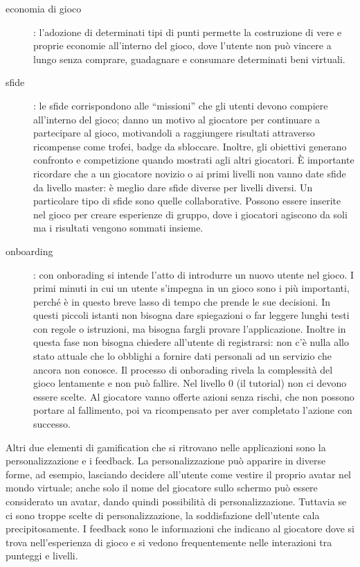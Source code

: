 \begin{description}
    \item[economia di gioco]: l'adozione di determinati tipi di punti permette la costruzione di vere e proprie economie all'interno del gioco, dove l'utente non può vincere a lungo senza comprare, guadagnare e consumare determinati beni virtuali.
    \item[sfide]: le sfide corrispondono alle ``missioni'' che gli utenti devono compiere all'interno del gioco; danno un motivo al giocatore per continuare a partecipare al gioco, motivandoli a raggiungere risultati attraverso ricompense come trofei, badge da sbloccare. Inoltre, gli obiettivi generano confronto e competizione quando mostrati agli altri giocatori. È importante ricordare che a un giocatore novizio o ai primi livelli non vanno date sfide da livello master: è meglio dare sfide diverse per livelli diversi. Un particolare tipo di sfide sono quelle collaborative. Possono essere inserite nel gioco per creare esperienze di gruppo, dove i giocatori agiscono da soli ma i risultati vengono sommati insieme.
    \item[onboarding]: con onborading si intende l'atto di introdurre un nuovo utente nel gioco. I primi minuti in cui un utente s'impegna in un gioco sono i più importanti, perché è in questo breve lasso di tempo che prende le sue decisioni. In questi piccoli istanti non bisogna dare spiegazioni o far leggere lunghi testi con regole o istruzioni, ma bisogna fargli provare l'applicazione. Inoltre in questa fase non bisogna chiedere all'utente di registrarsi: non c'è nulla allo stato attuale che lo obblighi a fornire dati personali ad un servizio che ancora non conosce. Il processo di onborading rivela la complessità del gioco lentamente e non può fallire. Nel livello 0 (il tutorial) non ci devono essere scelte. Al giocatore vanno offerte azioni senza rischi, che non possono portare al fallimento, poi va ricompensato per aver completato l'azione con successo.
\end{description}

Altri due elementi di gamification che si ritrovano nelle applicazioni sono la personalizzazione e i feedback.
La personalizzazione può apparire in diverse forme, ad esempio, lasciando decidere all'utente come vestire il proprio avatar nel mondo virtuale; anche solo il nome del giocatore sullo schermo può essere considerato un avatar, dando quindi possibilità di personalizzazione. Tuttavia se ci sono troppe scelte di personalizzazione, la soddisfazione dell'utente cala precipitosamente.
I feedback sono le informazioni che indicano al giocatore dove si trova nell'esperienza di gioco e si vedono frequentemente nelle interazioni tra punteggi e livelli.

